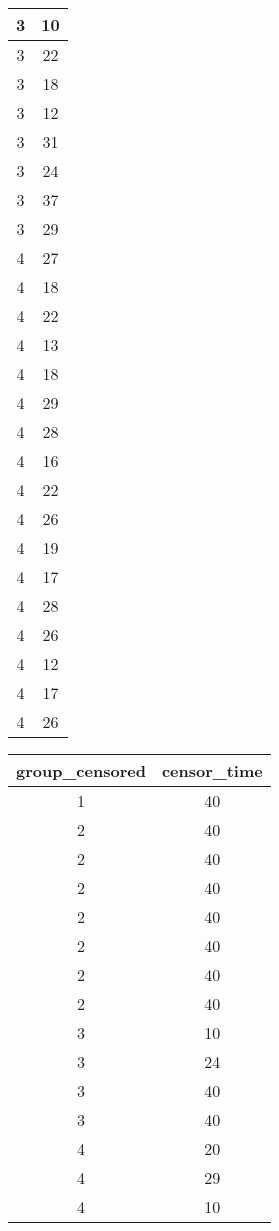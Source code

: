 \documentclass[]{article}
\begin{document}
\begin{table}
\begin{tabular}[t]{c|c}
\hline
3 & 10\\
\hline
3 & 22\\
\hline
3 & 18\\
\hline
3 & 12\\
\hline
3 & 31\\
\hline
3 & 24\\
\hline
3 & 37\\
\hline
3 & 29\\
\hline
4 & 27\\
\hline
4 & 18\\
\hline
4 & 22\\
\hline
4 & 13\\
\hline
4 & 18\\
\hline
4 & 29\\
\hline
4 & 28\\
\hline
4 & 16\\
\hline
4 & 22\\
\hline
4 & 26\\
\hline
4 & 19\\
\hline
4 & 17\\
\hline
4 & 28\\
\hline
4 & 26\\
\hline
4 & 12\\
\hline
4 & 17\\
\hline
4 & 26\\
\hline
\end{tabular}
\centering
\begin{tabular}[t]{c|c}
\hline
group\_censored & censor\_time\\
\hline
1 & 40\\
\hline
2 & 40\\
\hline
2 & 40\\
\hline
2 & 40\\
\hline
2 & 40\\
\hline
2 & 40\\
\hline
2 & 40\\
\hline
2 & 40\\
\hline
3 & 10\\
\hline
3 & 24\\
\hline
3 & 40\\
\hline
3 & 40\\
\hline
4 & 20\\
\hline
4 & 29\\
\hline
4 & 10\\
\hline
\end{tabular}
\end{table}
\end{document}
